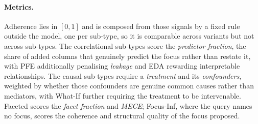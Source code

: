 \paragraph{Metrics.} Adherence lies in $[0,1]$ and is composed from those signals by a fixed rule outside the model, one per sub-type, so it is comparable across variants but not across sub-types. The correlational sub-types score the \emph{predictor fraction}, the share of added columns that genuinely predict the focus rather than restate it, with \textsf{PFE} additionally penalising \emph{leakage} and \textsf{EDA} rewarding interpretable relationships. The causal sub-types require a \emph{treatment} and its \emph{confounders}, weighted by whether those confounders are genuine common causes rather than mediators, with \textsf{What-If} further requiring the treatment to be intervenable. \textsf{Faceted} scores the \emph{facet fraction} and \emph{MECE}; \textsf{Focus-Inf}, where the query names no focus, scores the coherence and structural quality of the focus proposed.

%

